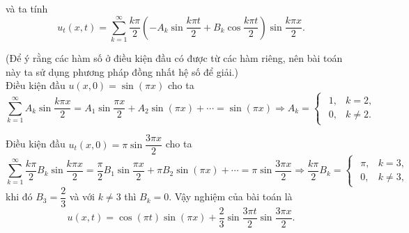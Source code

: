 \documentclass[10pt, a4paper]{article}
\begin{document}
	và ta tính $$u_t(x,t)=\sum_{k=1}^\infty\frac{k\pi}{2}\left(-A_k\sin\frac{k\pi t}{2}+B_k\cos\frac{k\pi t}{2}\right)\sin\frac{k\pi x}{2}.$$
	
	(Để ý rằng các hàm số ở điều kiện đầu có được từ các hàm riêng, nên bài toán này ta sử dụng phương pháp đồng nhất hệ số để giải.)\\
	
	Điều kiện đầu $u(x,0)=\sin(\pi x)$ cho ta $$\sum_{k=1}^\infty A_k\sin\frac{k\pi x}{2}=A_1\sin\frac{\pi x}{2}+A_2\sin(\pi x)+\cdots=\sin(\pi x)\Rightarrow A_k=\begin{cases}
		\begin{array}{ll}
			1, & k=2, \\
			0, & k\ne2.
		\end{array}
	\end{cases}$$
	
	Điều kiện đầu $u_t(x,0)=\pi\sin\dfrac{3\pi x}{2}$ cho ta $$\sum_{k=1}^\infty\frac{k\pi}{2}B_k\sin\frac{k\pi x}{2}=\frac\pi2B_1\sin\frac{\pi x}{2}+\pi B_2\sin(\pi x)+\cdots=\pi\sin\frac{3\pi x}{2}\Rightarrow \frac{k\pi}{2}B_k=\begin{cases}
		\begin{array}{ll}
			\pi, & k=3, \\
			0, & k\ne3,
		\end{array}
	\end{cases}$$
	khi đó $B_3=\dfrac23$ và với $k\ne3$ thì $B_k=0$. Vậy nghiệm của bài toán là $$u(x,t)=\cos(\pi t)\sin(\pi x)+\frac23\sin\frac{3\pi t}{2}\sin\frac{3\pi x}{2}.$$
\end{document}
